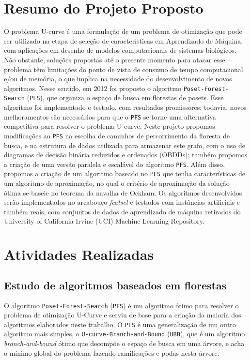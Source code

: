 \documentclass[12pt]{article}
\newcommand{\foreignword}[1]{\textit{#1}}
\newcommand{\toolname}[1]{\textit{#1}}
\newcommand{\algname}[1]{\texttt{#1}}
\begin{document}
\section{Resumo do Projeto Proposto} \label{sec:resumo} %
O problema U-curve é uma formulação de um problema de otimização que 
pode ser utilizado na etapa de seleção de características em 
Aprendizado de Máquina, com aplicações em desenho de modelos 
computacionais de sistemas biológicos. Não obstante, soluções propostas 
até o presente momento para atacar esse problema têm limitações do 
ponto de vista de consumo de tempo computacional e/ou de memória, o que 
implica na necessidade do desenvolvimento de novos algoritmos. Nesse 
sentido, em 2012 foi proposto o algoritmo 
\algname{Poset\--Forest\--Search} (\algname{PFS}), 
que organiza o espaço de busca em florestas de posets. Esse algoritmo 
foi implementado e testado, com resultados promissores; todavia, novos 
melhoramentos são necessários para que o \algname{PFS} se torne uma 
alternativa competitiva para resolver o problema U-curve. Neste projeto 
propomos modificações ao \algname{PFS} na escolha de caminhos de 
percorrimento da floresta de busca, e na estrutura de dados utilizada 
para armazenar este grafo, com o uso de diagramas de decisão binária 
reduzidos e ordenados (OBDDs); também propomos a criação de uma versão 
paralela e escalável do algoritmo \algname{PFS}. Além disso, propomos a 
criação de um algoritmo baseado no \algname{PFS} que tenha 
características de um algoritmo de aproximação, no qual o critério de 
aproximação da solução ótima se baseie no teorema da navalha de Ockham. 
Os algoritmos desenvolvidos serão implementados no arcabouço 
\toolname{featsel} e testados com instâncias artificiais e também reais,
com conjuntos de dados de aprendizado de máquina retirados do University 
of California Irvine (UCI) Machine Learning Repository.

 
\section{Atividades Realizadas}
\subsection{Estudo de algoritmos baseados em florestas}
O algoritmo \algname{Poset\--Forest\--Search} (\algname{PFS}) é um 
algoritmo ótimo para resolver o problema de otimização U-Curve e serviu 
de base para a criação da maioria dos algoritmos elaborados neste 
trabalho. O \algname{PFS} é uma generalização de um outro algoritmo mais
simples, o \algname{U-curve-Branch-and-Bound} (\algname{UBB}), que é
um algoritmo \foreignword{branch-and-bound} ótimo que decompõe o espaço
de busca em uma árvore, e acha o mínimo global do problema fazendo 
ramificações e podas nesta árvore.
\end{document}
